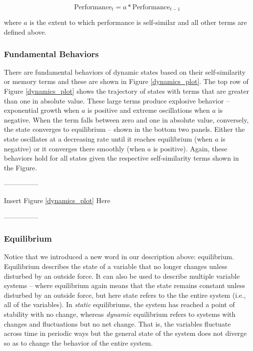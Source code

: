 \documentclass[english,,man]{apa6}
\begin{document}
\begin{equation}
\textrm{Performance}_{t} = a * \textrm{Performance}_{t-1}
\end{equation}

\noindent where \(a\) is the extent to which performance is self-similar and all other terms are defined above.

\hypertarget{fundamental-behaviors}{%
\subsubsection{Fundamental Behaviors}\label{fundamental-behaviors}}

There are fundamental behaviors of dynamic states based on their self-similarity or memory terms and these are shown in Figure \ref{dynamics_plot}. The top row of Figure \ref{dynamics_plot} shows the trajectory of states with terms that are greater than one in absolute value. These large terms produce explosive behavior -- exponential growth when \(a\) is positive and extreme oscillations when \(a\) is negative. When the term falls between zero and one in absolute value, conversely, the state converges to equilibrium -- shown in the bottom two panels. Either the state oscillates at a decreasing rate until it reaches equilibrium (when \(a\) is negative) or it converges there smoothly (when \(a\) is positive). Again, these behaviors hold for all states given the respective self-similarity terms shown in the Figure.

\begin{center}

---------------

Insert Figure \ref{dynamics_plot} Here

---------------

\end{center}

\hypertarget{equilibrium}{%
\subsubsection{Equilibrium}\label{equilibrium}}

Notice that we introduced a new word in our description above: equilibrium. Equilibrium describes the state of a variable that no longer changes unless disturbed by an outside force. It can also be used to describe multiple variable systems -- where equilibrium again means that the state remains constant unless disturbed by an outside force, but here state refers to the the entire system (i.e., all of the variables). In \emph{static} equilibriums, the system has reached a point of stability with no change, whereas \emph{dynamic} equilibrium refers to systems with changes and fluctuations but no net change. That is, the variables fluctuate across time in periodic ways but the general state of the system does not diverge so as to change the behavior of the entire system.
\end{document}
